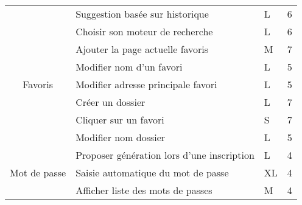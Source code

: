 \documentclass[10pt,a4paper]{article}
\begin{document}
\begin{table}[H]
\begin{tabular}{|c|l|l|l|}
                                        & Suggestion basée sur historique              & L                                            & 6                                           \\ \cline{2-4} 
                                        & Choisir son moteur de recherche              & L                                            & 6                                           \\ \hline
\multirow{5}{*}{Favoris}                & Ajouter la page actuelle favoris             & M                                            & 7                                           \\ \cline{2-4} 
                                        & Modifier nom d'un favori                         & L                                            & 5                                           \\ \cline{2-4} 
                                        & Modifier adresse principale favori                     & L                                            & 5                                           \\ \cline{2-4} 
                                        & Créer un dossier                             & L                                            & 7                                           \\ \cline{2-4}
                                        & Cliquer sur un favori                             & S                                            & 7                                           \\ \cline{2-4} 
                                        & Modifier nom dossier                         & L                                            & 5                                           \\ \hline
\multirow{4}{*}{Mot de passe}           & Proposer génération lors d'une inscription   & L                                            & 4                                           \\ \cline{2-4} 
                                        & Saisie automatique du mot de passe           & XL                                           & 4                                           \\ \cline{2-4} 
                                        & Afficher liste des mots de passes            & M                                            & 4                                           \\ \cline{2-4} 

\end{tabular}
\end{table}
\end{document}
